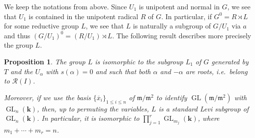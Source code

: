 \documentclass[11pt,letterpaper,reqno]{amsart}
\newtheorem{proposition}[proposition]{Proposition}
\theoremstyle{remark}
\theoremstyle{definition}
\def\M{\mathfrak{m}}
\newcommand{\KK}[0]{\ensuremath{\mathbf{k}}}
\newcommand{\GL}[0]{\ensuremath{\operatorname{GL}}}
\begin{document}
We keep the notations from above. Since $U_1$ is unipotent and normal in $G$, we see that $U_1$ is contained in the unipotent radical $R$ of $G$. In particular, if $G^0=R\rtimes L$ for some reductive group $L$, we see that $L$ is naturally a subgroup of $G/U_1$ via $a$ and thus $(G/U_1)^0=(R/U_1)\rtimes L$. The following result describes more precisely the group $L$.

\begin{proposition}\label{prop:levi}
The group $L$ is isomorphic to the subgroup $L_1$ of $G$ generated by $T$ and the $U_\alpha$ with $s(\alpha)=0$ and such that both $\alpha$ and $-\alpha$ are roots, i.e.~belong to $\mathcal R(I)$.

Moreover, if we use the basis $\{\overline x_i\}_{1\leq i\leq n}$ of $\M/\M^2$ to identify $\GL(\M/\M^2)$ with $\GL_n(\KK)$, then, up to permuting the variables, $L$ is a standard Levi subgroup of $\GL_n(\KK)$. In particular, it is isomorphic to $\prod_{j=1}^r\GL_{m_j}(\KK)$, where $m_1+\cdots+m_r=n$.
\end{proposition}
\end{document}
